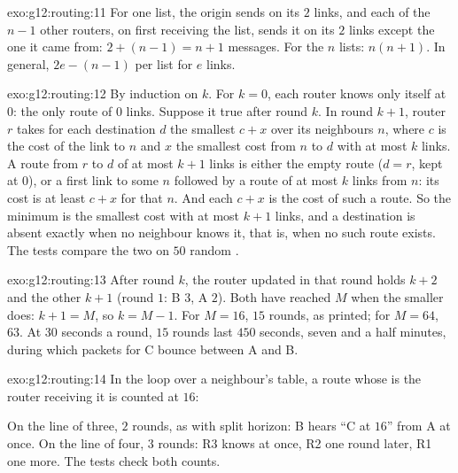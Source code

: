 \begin{solution}{exo:g12:routing:11}
For one list, the origin sends on its $2$ links, and each of the $n - 1$ other routers, on first receiving the list,
sends it on its $2$ links except the one it came from: $2 + (n - 1) = n + 1$ messages. For the $n$ lists:
$n(n + 1)$. In general, $2e - (n - 1)$ per list for $e$ links.
\end{solution}

\begin{solution}{exo:g12:routing:12}
By induction on $k$. For $k = 0$, each router knows only itself at $0$: the only route of $0$ links. Suppose it true
after round $k$. In round $k + 1$, router $r$ takes for each destination $d$ the smallest $c + x$ over its
neighbours $n$, where $c$ is the cost of the link to $n$ and $x$ the smallest cost from $n$ to $d$ with at most $k$
links. A route from $r$ to $d$ of at most $k + 1$ links is either the empty route ($d = r$, kept at $0$), or a first
link to some $n$ followed by a route of at most $k$ links from $n$: its cost is at least $c + x$ for that $n$. And
each $c + x$ is the cost of such a route. So the minimum is the smallest cost with at most $k + 1$ links, and a
destination is absent exactly when no neighbour knows it, that is, when no such route exists. The tests compare the
two on $50$ random .
\end{solution}

\begin{solution}{exo:g12:routing:13}
After round $k$, the router updated in that round holds $k + 2$ and the other $k + 1$ (round $1$: B $3$, A $2$).
Both have reached $M$ when the smaller does: $k + 1 = M$, so $k = M - 1$. For $M = 16$, $15$ rounds, as printed; for
$M = 64$, $63$. At $30$ seconds a round, $15$ rounds last $450$ seconds, seven and a half minutes, during which
packets for C bounce between A and B.
\end{solution}

\begin{solution}{exo:g12:routing:14}
In the loop over a neighbour's table, a route whose  is the router receiving it is counted at $16$:

\smallskip\noindent\hspace*{2em}

\noindent\hspace*{4em}

\smallskip\noindent On the line of three, $2$ rounds, as with split horizon: B hears ``C at $16$'' from A at once. On
the line of four, $3$ rounds: R3 knows at once, R2 one round later, R1 one more. The tests check both counts.
\end{solution}

